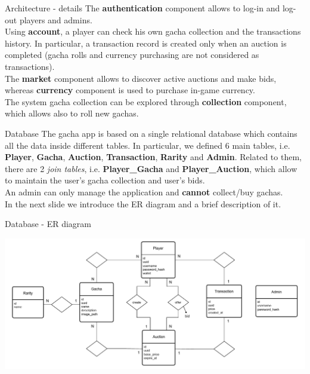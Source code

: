 \documentclass[12pt,aspectratio=169,notheorems]{beamer}
\begin{document}
\begin{frame}{Architecture - details}
    The \textbf{authentication} component allows to log-in and log-out players and admins. \\[1ex]
    Using \textbf{account}, a player can check his own gacha collection and the transactions history. In particular, a transaction record is created only when an auction is completed (gacha rolls and currency purchasing are not considered as transactions). \\[1ex]
    The \textbf{market} component allows to discover active auctions and make bids, whereas \textbf{currency} component is used to purchase in-game currency. \\[1ex]
    The system gacha collection can be explored through \textbf{collection} component, which allows also to roll new gachas.
\end{frame}

\begin{frame}{Database}
    The gacha app is based on a single relational database which contains all the data inside different tables. In particular, we defined 6 main tables, i.e. \textbf{Player}, \textbf{Gacha}, \textbf{Auction}, \textbf{Transaction}, \textbf{Rarity} and \textbf{Admin}. Related to them, there are 2 \emph{join tables}, i.e. \textbf{Player\_Gacha} and \textbf{Player\_Auction}, which allow to maintain the user's gacha collection and user's bids. \\[1ex]
    An admin can only manage the application and \textbf{cannot} collect/buy gachas. \\[1ex]
    In the next slide we introduce the ER diagram and a brief description of it.  
\end{frame}

\begin{frame}{Database - ER diagram}
    \begin{center}
        \includegraphics[scale=.5]{ASE-er-v4.png}
    \end{center}
\end{frame}
\end{document}
